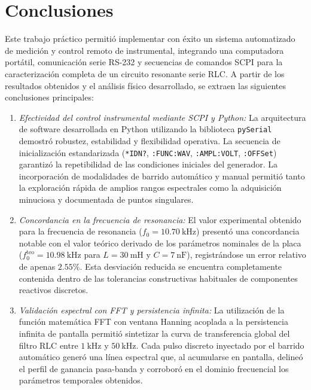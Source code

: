\chapter{Conclusiones}

Este trabajo práctico permitió implementar con éxito un sistema automatizado de medición y control
remoto de instrumental, integrando una computadora portátil, comunicación serie RS-232 y secuencias de
comandos SCPI para la caracterización completa de un circuito resonante serie RLC. A partir de los resultados obtenidos
y el análisis físico desarrollado, se extraen las siguientes conclusiones principales:

\begin{enumerate}
    \item \emph{Efectividad del control instrumental mediante SCPI y Python:} La arquitectura de software desarrollada
    en Python utilizando la biblioteca \texttt{pySerial} demostró robustez, estabilidad y flexibilidad operativa. La
    secuencia de inicialización estandarizada (\texttt{*IDN?}, \texttt{:FUNC:WAV}, \texttt{:AMPL:VOLT}, \texttt{:OFFSet})
    garantizó la repetibilidad de las condiciones iniciales del generador. La incorporación de modalidades de
    barrido automático y manual permitió tanto la exploración
    rápida de amplios rangos espectrales como la adquisición minuciosa y documentada de puntos singulares.
    \item \emph{Concordancia en la frecuencia de resonancia:} El valor experimental obtenido para la frecuencia de
    resonancia ($f_0 = \qty{10.70}{\kilo\hertz}$) presentó una concordancia notable con el valor teórico derivado de
    los parámetros nominales de la placa ($f_0^{\text{teo}} = \qty{10.98}{\kilo\hertz}$ para $L = \qty{30}{\milli\henry}$
    y $C = \qty{7}{\nano\farad}$), registrándose un error relativo de apenas $2.55\%$. Esta desviación reducida se
    encuentra completamente contenida dentro de las tolerancias constructivas habituales de componentes reactivos discretos.
    \item \emph{Validación espectral con FFT y persistencia infinita:} La utilización de la función matemática FFT con
    ventana Hanning acoplada a la persistencia infinita de pantalla permitió sintetizar la curva de transferencia
    global del filtro RLC entre $\qty{1}{\kilo\hertz}$ y $\qty{50}{\kilo\hertz}$. Cada pulso discreto inyectado por el
    barrido automático generó una línea espectral que, al acumularse en pantalla, delineó el perfil de ganancia
    pasa-banda y corroboró en el dominio frecuencial los parámetros temporales obtenidos.
\end{enumerate}

